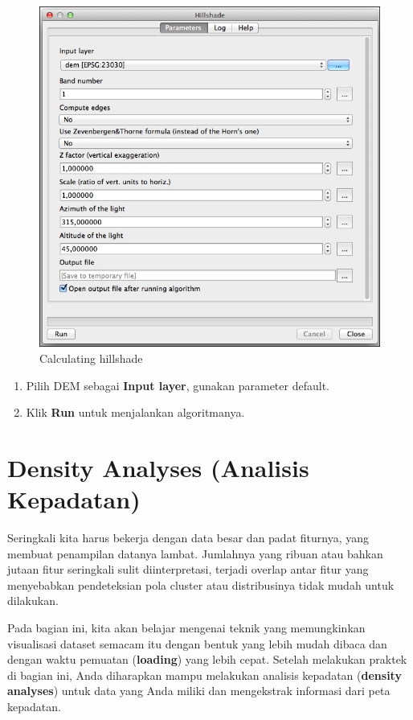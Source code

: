 \documentclass[]{book}
\begin{document}
\begin{figure}

{\centering \includegraphics[width=0.7\linewidth]{images/04/fig73} 

}

\caption{Calculating hillshade}\label{fig:fig1473}
\end{figure}

\begin{enumerate}
\def\labelenumi{\arabic{enumi}.}
\setcounter{enumi}{1}
\item
  Pilih DEM sebagai \textbf{Input layer}, gunakan parameter default.
\item
  Klik \textbf{Run} untuk menjalankan algoritmanya.
\end{enumerate}

\hypertarget{density-analyses-analisis-kepadatan}{%
\section{Density Analyses (Analisis Kepadatan)}\label{density-analyses-analisis-kepadatan}}

Seringkali kita harus bekerja dengan data besar dan padat fiturnya, yang membuat penampilan datanya lambat. Jumlahnya yang ribuan atau bahkan jutaan fitur seringkali sulit diinterpretasi, terjadi overlap antar fitur yang menyebabkan pendeteksian pola cluster atau distribusinya tidak mudah untuk dilakukan.

Pada bagian ini, kita akan belajar mengenai teknik yang memungkinkan visualisasi dataset semacam itu dengan bentuk yang lebih mudah dibaca dan dengan waktu pemuatan (\textbf{loading}) yang lebih cepat. Setelah melakukan praktek di bagian ini, Anda diharapkan mampu melakukan analisis kepadatan (\textbf{density analyses}) untuk data yang Anda miliki dan mengekstrak informasi dari peta kepadatan.
\end{document}
